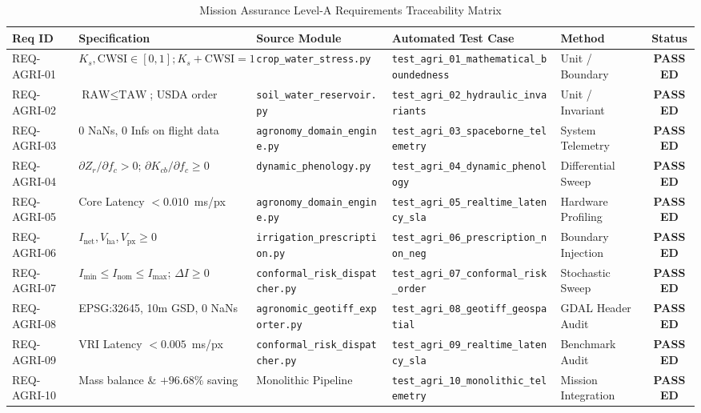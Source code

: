 \documentclass[11pt,a4paper]{article}
\theoremstyle{definition}
\theoremstyle{remark}
\begin{document}
\begin{table}[htbp]
\centering
\caption{Mission Assurance Level-A Requirements Traceability Matrix}
\label{tab:traceability}
\small
\begin{tabular}{lllllc}
\toprule
\textbf{Req ID} & \textbf{Specification} & \textbf{Source Module} & \textbf{Automated Test Case} & \textbf{Method} & \textbf{Status} \\
\midrule
REQ-AGRI-01 & $K_s, \text{CWSI} \in [0, 1]; K_s+\text{CWSI}=1$ & \texttt{crop\_water\_stress.py} & \texttt{test\_agri\_01\_mathematical\_boundedness} & Unit / Boundary & \textbf{PASSED} \\
REQ-AGRI-02 & $\text{RAW} \le \text{TAW}$; USDA order & \texttt{soil\_water\_reservoir.py} & \texttt{test\_agri\_02\_hydraulic\_invariants} & Unit / Invariant & \textbf{PASSED} \\
REQ-AGRI-03 & 0 NaNs, 0 Infs on flight data & \texttt{agronomy\_domain\_engine.py} & \texttt{test\_agri\_03\_spaceborne\_telemetry} & System Telemetry & \textbf{PASSED} \\
REQ-AGRI-04 & $\partial Z_r/\partial f_c > 0$; $\partial K_{cb}/\partial f_c \ge 0$ & \texttt{dynamic\_phenology.py} & \texttt{test\_agri\_04\_dynamic\_phenology} & Differential Sweep & \textbf{PASSED} \\
REQ-AGRI-05 & Core Latency $< 0.010$~ms/px & \texttt{agronomy\_domain\_engine.py} & \texttt{test\_agri\_05\_realtime\_latency\_sla} & Hardware Profiling & \textbf{PASSED} \\
REQ-AGRI-06 & $I_{\text{net}}, V_{\text{ha}}, V_{\text{px}} \ge 0$ & \texttt{irrigation\_prescription.py} & \texttt{test\_agri\_06\_prescription\_non\_neg} & Boundary Injection & \textbf{PASSED} \\
REQ-AGRI-07 & $I_{\min} \le I_{\text{nom}} \le I_{\max}$; $\Delta I \ge 0$ & \texttt{conformal\_risk\_dispatcher.py} & \texttt{test\_agri\_07\_conformal\_risk\_order} & Stochastic Sweep & \textbf{PASSED} \\
REQ-AGRI-08 & EPSG:32645, 10m GSD, 0 NaNs & \texttt{agronomic\_geotiff\_exporter.py} & \texttt{test\_agri\_08\_geotiff\_geospatial} & GDAL Header Audit & \textbf{PASSED} \\
REQ-AGRI-09 & VRI Latency $< 0.005$~ms/px & \texttt{conformal\_risk\_dispatcher.py} & \texttt{test\_agri\_09\_realtime\_latency\_sla} & Benchmark Audit & \textbf{PASSED} \\
REQ-AGRI-10 & Mass balance \& $+96.68\%$ saving & Monolithic Pipeline & \texttt{test\_agri\_10\_monolithic\_telemetry} & Mission Integration & \textbf{PASSED} \\
\bottomrule
\end{tabular}
\end{table}
\end{document}
